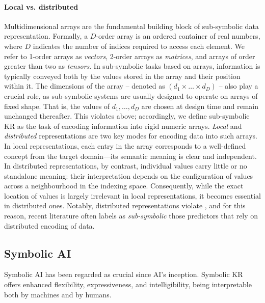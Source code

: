 \paragraph{Local vs. distributed}
%
Multidimensional arrays are the fundamental building block of sub-symbolic data representation.
%
Formally, a $D$-order array is an ordered container of real numbers, where $D$ indicates the number of indices required to access each element.
%
We refer to 1-order arrays as \emph{vectors}, 2-order arrays as \emph{matrices}, and arrays of order greater than two as \emph{tensors}.
%
In sub-symbolic tasks based on arrays, information is typically conveyed both by the values stored in the array and their position within it.
%
The dimensions of the array -- denoted as $(d_1 \times \dots \times d_D)$ -- also play a crucial role, as sub-symbolic systems are usually designed to operate on arrays of fixed shape.
%
That is, the values of $d_1, \dots, d_D$ are chosen at design time and remain unchanged thereafter.
%
This violates  above; accordingly, we define sub-symbolic \gls{KR} as the task of encoding information into rigid numeric arrays.
%
\emph{Local} and \emph{distributed} representations are two key modes for encoding data into such arrays.
%
In local representations, each entry in the array corresponds to a well-defined concept from the target domain---its semantic meaning is clear and independent.
%
In distributed representations, by contrast, individual values carry little or no standalone meaning: their interpretation depends on the configuration of values across a neighbourhood in the indexing space.
%
Consequently, while the exact location of values is largely irrelevant in local representations, it becomes essential in distributed ones.
%
Notably, distributed representations violate , and for this reason, recent literature often labels as \emph{sub-symbolic} those predictors that rely on distributed encoding of data.


\subsection[Symbolic AI]{Symbolic \Gls{AI}}\label{subsec:symbolic-ai}
%
Symbolic \gls{AI} has been regarded as crucial since \gls{AI}'s inception.
%
Symbolic \gls{KR} offers enhanced flexibility, expressiveness, and intelligibility, being interpretable both by machines and by humans.

